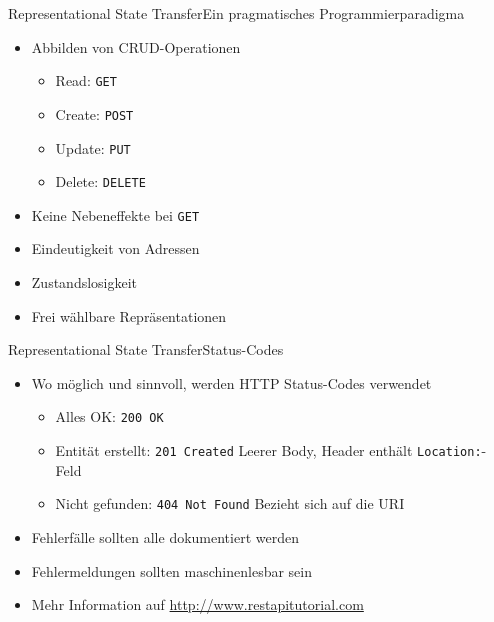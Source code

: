 
\begin{frame}{Representational State Transfer}{Ein pragmatisches Programmierparadigma}
    \begin{itemize}
        \item Abbilden von CRUD-Operationen
        \pause
        \begin{itemize}
            \item Read: \texttt{GET}
            \pause
            \item Create: \texttt{POST}
            \pause
            \item Update: \texttt{PUT}
            \pause
            \item Delete: \texttt{DELETE}
            \pause
        \end{itemize}
        \item Keine Nebeneffekte bei \texttt{GET}
        \pause
        \item Eindeutigkeit von Adressen
        \pause
        \item Zustandslosigkeit
        \pause
        \item Frei wählbare Repräsentationen
    \end{itemize}
\end{frame}


\begin{frame}{Representational State Transfer}{Status-Codes}
    \begin{itemize}
        \item Wo möglich und sinnvoll, werden HTTP Status-Codes verwendet
        \pause
        \begin{itemize}
            \item Alles OK: \texttt{200 OK}
            \pause
            \item Entität erstellt: \texttt{201 Created}
            \note[item] Leerer Body, Header enthält \texttt{Location:}-Feld 
            \pause
            \item Nicht gefunden: \texttt{404 Not Found}
            \note[item] Bezieht sich auf die URI
            \pause
        \end{itemize}
        \item Fehlerfälle sollten alle dokumentiert werden
        \pause
        \item Fehlermeldungen sollten maschinenlesbar sein
        \pause
        \item Mehr Information auf \url{http://www.restapitutorial.com}\cite{http-status-codes}
    \end{itemize}
\end{frame}

